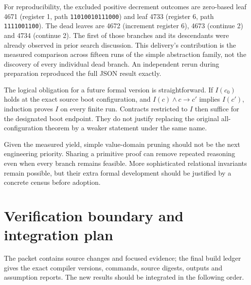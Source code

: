 \documentclass[11pt]{article}
\newcommand{\code}[1]{\texttt{\small #1}}
\begin{document}
For reproducibility, the excluded positive decrement outcomes are zero-based leaf 4671 (register 1, path \code{11010010111000}) and leaf 4733 (register 6, path \code{1111001100}). The dead leaves are 4672 (increment register 6), 4673 (continue 2) and 4734 (continue 2). The first of those branches and its descendants were already observed in prior search discussion. This delivery's contribution is the measured comparison across fifteen runs of the simple abstraction family, not the discovery of every individual dead branch. An independent rerun during preparation reproduced the full JSON result exactly.

The logical obligation for a future formal version is straightforward. If $I(c_0)$ holds at the exact source boot configuration, and $I(c)\land c\to c'$ implies $I(c')$, induction proves $I$ on every finite run. Contracts restricted to $I$ then suffice for the designated boot endpoint. They do not justify replacing the original all-configuration theorem by a weaker statement under the same name.

Given the measured yield, simple value-domain pruning should not be the next engineering priority. Sharing a primitive proof can remove repeated reasoning even when every branch remains feasible. More sophisticated relational invariants remain possible, but their extra formal development should be justified by a concrete census before adoption.

\section{Verification boundary and integration plan}
\label{sec:integration}

The packet contains source changes and focused evidence; the final build ledger gives the exact compiler versions, commands, source digests, outputs and assumption reports. The new results should be integrated in the following order.
\end{document}

